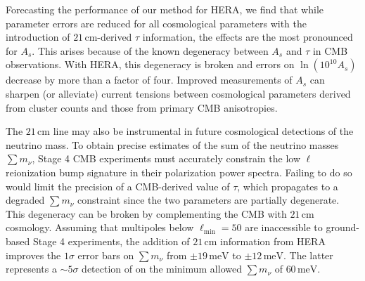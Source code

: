 \documentclass[twocolumn,aps,prd,nofootinbib,showpacs,superscriptaddress]{revtex4-1}
\begin{document}
Forecasting the performance of our method for HERA, we find that while parameter errors are reduced for all cosmological parameters with the introduction of $21\,\textrm{cm}$-derived $\tau$ information, the effects are the most pronounced for $A_s$. This arises because of the known degeneracy between $A_s$ and $\tau$ in CMB observations. With HERA, this degeneracy is broken and errors on $\ln (10^{10} A_s)$ decrease by more than a factor of four. Improved measurements of $A_s$ can sharpen (or alleviate) current tensions between cosmological parameters derived from cluster counts and those from primary CMB anisotropies.

The $21\,\textrm{cm}$ line may also be instrumental in future cosmological detections of the neutrino mass. To obtain precise estimates of the sum of the neutrino masses $\sum m_\nu$, Stage 4 CMB experiments must accurately constrain the low $\ell$ reionization bump signature in their polarization power spectra. Failing to do so would limit the precision of a CMB-derived value of $\tau$, which propagates to a degraded $\sum m_\nu$ constraint since the two parameters are partially degenerate. This degeneracy can be broken by complementing the CMB with $21\,\textrm{cm}$ cosmology. Assuming that multipoles below $\ell_\textrm{min} = 50$ are inaccessible to ground-based Stage 4 experiments, the addition of $21\,\textrm{cm}$ information from HERA improves the $1\sigma$ error bars on $\sum m_\nu$ from $\pm 19\,\textrm{meV}$ to $\pm 12\,\textrm{meV}$. The latter represents a $\sim\!5\sigma$ detection of on the minimum allowed $\sum m_\nu$ of $60\,\textrm{meV}$.
\end{document}
